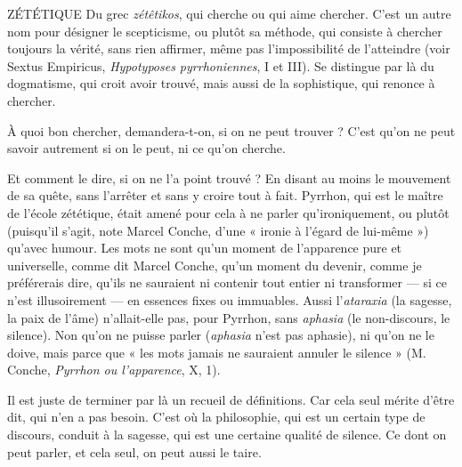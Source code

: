 ZÉTÉTIQUE Du grec {\it zétêtikos}, qui cherche ou qui aime chercher. C’est un
autre nom pour désigner le scepticisme, ou plutôt sa méthode,
qui consiste à chercher toujours la vérité, sans rien affirmer, même pas l’impossibilité
de l’atteindre (voir Sextus Empiricus, {\it Hypotyposes pyrrhoniennes}, I et
III). Se distingue par là du dogmatisme, qui croit avoir trouvé, mais aussi de la
sophistique, qui renonce à chercher.

À quoi bon chercher, demandera-t-on, si on ne peut trouver ? C’est qu’on
ne peut savoir autrement si on le peut, ni ce qu’on cherche.

Et comment le dire, si on ne l’a point trouvé ? En disant au moins le mouvement
de sa quête, sans l'arrêter et sans y croire tout à fait. Pyrrhon, qui est le
maître de l’école zététique, était amené pour cela à ne parler qu’ironiquement,
ou plutôt (puisqu'il s’agit, note Marcel Conche, d’une « ironie à l’égard de lui-même »)
qu'avec humour. Les mots ne sont qu’un moment de l'apparence pure
et universelle, comme dit Marcel Conche, qu’un moment du devenir, comme
je préférerais dire, qu’ils ne sauraient ni contenir tout entier ni transformer — si
ce n’est illusoirement — en essences fixes ou immuables. Aussi l’{\it ataraxia} (la
sagesse, la paix de l’âme) n’allait-elle pas, pour Pyrrhon, sans {\it aphasia} (le non-discours,
le silence). Non qu’on ne puisse parler ({\it aphasia} n’est pas aphasie), ni
qu’on ne le doive, mais parce que « les mots jamais ne sauraient annuler le
silence » (M. Conche, {\it Pyrrhon ou l'apparence}, X, 1).

Il est juste de terminer par là un recueil de définitions. Car cela seul mérite
d’être dit, qui n’en a pas besoin. C’est où la philosophie, qui est un certain type
de discours, conduit à la sagesse, qui est une certaine qualité de silence. Ce dont
on peut parler, et cela seul, on peut aussi le taire.

